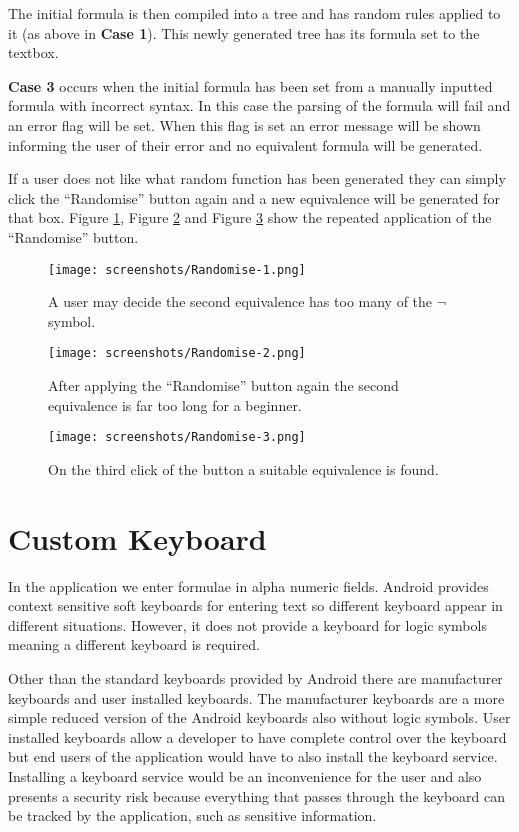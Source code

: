 \documentclass{report}
\begin{document}
The initial formula is then compiled into a tree and has random rules applied to it (as above in \textbf{Case 1}). This newly generated tree has its formula set to the textbox.

\textbf{Case 3} occurs when the initial formula has been set from a manually inputted formula with incorrect syntax. In this case the parsing of the formula will fail and an error flag will be set. When this flag is set an error message will be shown informing the user of their error and no equivalent formula will be generated.

If a user does not like what random function has been generated they can simply click the ``Randomise'' button again and a new equivalence will be generated for that box. Figure \ref{randomise1}, Figure \ref{randomise2} and Figure \ref{randomise3} show the repeated application of the ``Randomise'' button.

\begin{figure}[ht!]
    \centering
    \texttt{[image: screenshots/Randomise-1.png]}
    \caption{A user may decide the second equivalence has too many of the $\lnot$ symbol.}
    \label{randomise1}
\end{figure}

\begin{figure}[ht!]
    \centering
    \texttt{[image: screenshots/Randomise-2.png]}
    \caption{After applying the ``Randomise'' button again the second equivalence is far too long for a beginner.}
    \label{randomise2}
\end{figure}

\begin{figure}[ht!]
    \centering
    \texttt{[image: screenshots/Randomise-3.png]}
    \caption{On the third click of the button a suitable equivalence is found.}
    \label{randomise3}
\end{figure}

\section{Custom Keyboard}
\label{sec:custom_keyboard}

In the application we enter formulae in alpha numeric fields. Android provides context sensitive soft keyboards for entering text so different keyboard appear in different situations. However, it does not provide a keyboard for logic symbols meaning a different keyboard is required.

Other than the standard keyboards provided by Android there are manufacturer keyboards and user installed keyboards. The manufacturer keyboards are a more simple reduced version of the Android keyboards also without logic symbols. User installed keyboards allow a developer to have complete control over the keyboard but end users of the application would have to also install the keyboard service. Installing a keyboard service would be an inconvenience for the user and also presents a security risk because everything that passes through the keyboard can be tracked by the application, such as sensitive information. 
\end{document}
